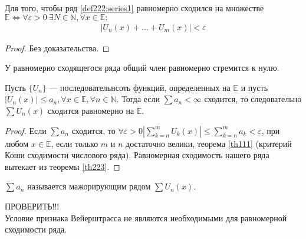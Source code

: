 \begin{theorem}
  \label{th223}
  Для того, чтобы ряд \eqref{def222:series1} равномерно сходился на множестве
  $\mathbb{E} \Longleftrightarrow \forall \varepsilon > 0 \ \exists N \in \mathbb{N},
  \forall x \in \mathbb{E}: $
  \begin{gather}
    |U_n(x) + \dots + U_m(x)| < \varepsilon \label{th223:uneq1}
  \end{gather}
\end{theorem}

\begin{proof}
  Без доказательства.
\end{proof}

\begin{consequence}
  У равномерно сходящегося ряда общий член равномерно стремится к нулю.
\end{consequence}

\begin{theorem}
  Пусть $\{U_n\}$ --- последовательнсоть функций, определенных на $\mathbb{E}$
  и пусть $|U_n(x)| \leq a_n, \forall x \in \mathbb{E}, \forall n \in \mathbb{N}.$
  Тогда если $\sum a_n < \infty$ сходится, то следовательно $\sum U_n(x)$ сходится
  равномерно на $\mathbb{E}$.
\end{theorem}
\begin{proof}
  Если $\sum a_n$ сходится, то $\forall \varepsilon > 0 |
  \sum\limits_{k = n}^{m} U_k(x)| \leq
  \sum\limits_{k = n}^{m} a_k < \varepsilon$, при любом $x \in \mathbb{E}$,
  если только $m$ и $n$ достаточно велики, теорема \eqref{th111} (критерий Коши
  сходимости числового ряда). Равномерная сходимость нашего ряда вытекает из
  теоремы \eqref{th223}.
\end{proof}
\begin{remark}
  $\sum a_n$ называется мажорирующим рядом $\sum U_n(x)$.
\end{remark}

\begin{remark}
  ПРОВЕРИТЬ!!! \\
  Условие признака Вейерштрасса не являются необходимыми для равномерной
  сходимости ряда.
\end{remark}

